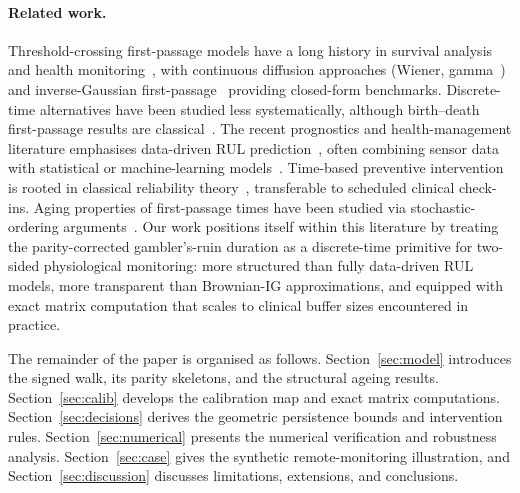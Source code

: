 \documentclass[pdflatex,sn-mathphys-num]{sn-jnl}
\theoremstyle{definition}
\numberwithin{equation}{section}
\begin{document}
\paragraph{Related work.} Threshold-crossing first-passage models have a long history in survival analysis and health monitoring~\cite{aalen2001understanding,jie2026optimal,yu2026microscopic,gao2026fault,yu2026chemotactic,liang2025global}, with continuous diffusion approaches (Wiener, gamma~\cite{van2009survey,wang2025hybrid,ye2015stochastic,wang2026vital,wang2010wiener,wang2026algebraic}) and inverse-Gaussian first-passage~\cite{chhikara2024inverse,seshadri2012inverse,wang2026finite,ye2014inverse,wang2010inverse,yu2026diagnostic,ye2014accelerated,peng2015inverse,yu2026controlling} providing closed-form benchmarks. Discrete-time alternatives have been studied less systematically, although birth--death first-passage results are classical~\cite{karlin1981second,ching2006markov,wang2026damage,wang2025well,zhang2020molecular,valenzuela2022markov}. The recent prognostics and health-management literature emphasises data-driven RUL prediction~\cite{lei2018machinery,yu2026structural,si2011remaining,yu2026pattern,ahmadzadeh2014remaining,zhang2023review,wang2026first}, often combining sensor data with statistical or machine-learning models~\cite{liu2010adaptive,zhang2016multiobjective,yu2026endogenous,chen2023transfer,wang2026breakdown,li2022domain,wu2024remaining,deutsch2017using,li2024review,wang2026introduction,yu2026optimization1}. Time-based preventive intervention is rooted in classical reliability theory~\cite{barlow1996mathematical,aven1999stochastic,yu2026rigorous,wang2002survey,yu2026fredholm,sanchez2016maintenance,gibbs2026optimal,losidis2024refinement,sanoubar2023optimal,wang2026introduction2,yu2026mode,pham1996imperfect,yu2026optimization2}, transferable to scheduled clinical check-ins. Aging properties of first-passage times have been studied via stochastic-ordering arguments~\cite{shaked2007stochastic,yu2026bilinear,boland2002stochastic,yu2026beyond,li2013stochastic,klump2024elementary,wang2026elliptic,kayid2023stochastic,wang2026lecture,yu2026optimization3}. Our work positions itself within this literature by treating the parity-corrected gambler's-ruin duration as a discrete-time primitive for two-sided physiological monitoring: more structured than fully data-driven RUL models, more transparent than Brownian-IG approximations, and equipped with exact matrix computation that scales to clinical buffer sizes encountered in practice.

The remainder of the paper is organised as follows.
Section~\ref{sec:model} introduces the signed walk, its parity skeletons, and
the structural ageing results. Section~\ref{sec:calib} develops the calibration
map and exact matrix computations. Section~\ref{sec:decisions} derives the
geometric persistence bounds and intervention rules.
Section~\ref{sec:numerical} presents the numerical verification and robustness
analysis. Section~\ref{sec:case} gives the synthetic remote-monitoring
illustration, and Section~\ref{sec:discussion} discusses limitations,
extensions, and conclusions.
\end{document}
